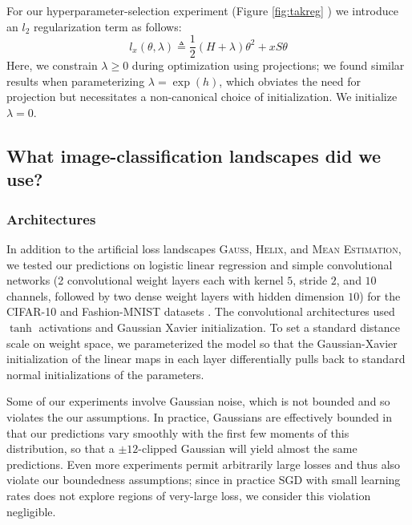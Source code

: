 \documentclass[anon,12pt]{colt2021} %
\newcommand{\ofthree}[1]{
    {\tiny \raisebox{0.04cm}{$
        \ifthenelse{\equal{#1}{0}}{{\color{moor}\blacksquare}}{\square}
        \ifthenelse{\equal{#1}{1}}{{\color{moor}\blacksquare}}{\square}    
        \ifthenelse{\equal{#1}{2}}{{\color{moor}\blacksquare}}{\square}
    $}}%
}
\newcommand{\Gauss}{\textsc{Gauss}}
\newcommand{\Helix}{\textsc{Helix}}
\newcommand{\MeanEstimation}{\textsc{Mean Estimation}}
\begin{document}
{            For our hyperparameter-selection experiment (Figure
            \ref{fig:takreg}\ofthree{2}) we introduce an $l_2$
            regularization term as follows:
            $$
                l_x(\theta, \lambda)
                \triangleq
                \frac{1}{2} (H + \lambda) \theta^2 + x S \theta
            $$
            Here, we constrain $\lambda\geq 0$ during optimization using
            projections; we found similar results when parameterizing $\lambda
            = \exp(h)$, which obviates the need for projection but necessitates
            a non-canonical choice of initialization.  We initialize
            $\lambda=0$.

    \subsection{What image-classification landscapes did we use?}   \label{appendix:natural}

        \subsubsection{Architectures}
            In addition to the artificial loss landscapes
                \Gauss, \Helix, and \MeanEstimation, 
                we tested our predictions on logistic linear regression
                and simple convolutional networks (2 convolutional weight layers
                each with kernel $5$, stride $2$, and $10$ channels, followed by
                two dense weight layers with hidden dimension $10$) for the
                CIFAR-10 \cite{kr09} and Fashion-MNIST datasets \cite{xi17}.  The
                convolutional architectures used $\tanh$ activations and Gaussian
                Xavier initialization.  To set a standard distance scale on weight
                space, we parameterized the model so that the
                Gaussian-Xavier initialization of the linear maps in each layer
                differentially pulls back to standard normal initializations of the
                parameters.

                Some of our experiments involve Gaussian noise, which is not
                bounded and so violates the our assumptions.  In practice,
                Gaussians are effectively bounded in that our predictions vary
                smoothly with the first few moments of this distribution, so
                that a $\pm 12$-clipped Gaussian will yield almost the same
                predictions.
                Even more experiments permit arbitrarily large losses and  
                thus also violate our boundedness assumptions; since in practice
                SGD with small learning rates does not explore regions of
                very-large loss, we consider this violation negligible.

}
\end{document}
